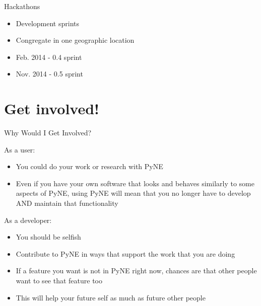 \documentclass[xcolor=x11names,compress]{beamer}
\begin{document}
\begin{frame}{Hackathons}
  \Large
    \begin{itemize}
        \item Development sprints
        \item Congregate in one geographic location
        \item Feb. 2014 - 0.4 sprint
        \item Nov. 2014 - 0.5 sprint
    \end{itemize}
\end{frame}


\section{Get involved!}
\begin{frame}{Why Would I Get Involved?}

\begin{block}{As a \alert{user}:}
    \begin{itemize}
    \item You could do your work or research with PyNE
    \item Even if you have your own software that looks and behaves similarly to some aspects of PyNE, using PyNE will mean that you no longer have to develop AND maintain that functionality
    \end{itemize}
\end{block}

    \vspace*{1 em}
\begin{block}{As a \alert{developer}:}
    \begin{itemize}
    \item You should be selfish
    \item Contribute to PyNE in ways that support the work that you are doing
    \item If a feature you want is not in PyNE right now, chances are that other
    people want to see that feature too
    \item This will help your future self as much as future other people
    \end{itemize}
\end{block}

\end{frame}
\end{document}
